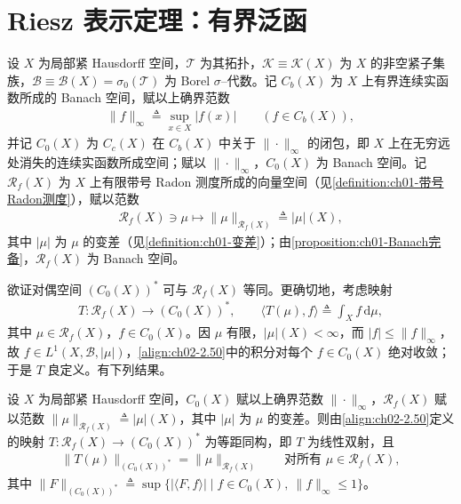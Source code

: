 \documentclass[../../main.tex]{subfiles}%
\begin{document}
\section{Riesz 表示定理：有界泛函}\label{section:ch02-Riesz有界泛函}

设 $X$ 为局部紧 Hausdorff 空间，$\mathscr T$ 为其拓扑，$\mathscr K\equiv\mathscr K(X)$ 为 $X$ 的非空紧子集族，$\mathscr B\equiv\mathscr B(X)=\sigma_0(\mathscr T)$ 为 Borel $\sigma$--代数。记 $C_b(X)$ 为 $X$ 上有界连续实函数所成的 Banach 空间，赋以上确界范数
\begin{align*}
\|f\|_\infty\triangleq\sup_{x\in X}|f(x)|\qquad (f\in C_b(X)),
\end{align*}
并记 $C_0(X)$ 为 $C_c(X)$ 在 $C_b(X)$ 中关于 $\|\cdot\|_\infty$ 的闭包，即 $X$ 上在无穷远处消失的连续实函数所成空间；赋以 $\|\cdot\|_\infty$，$C_0(X)$ 为 Banach 空间。记 $\mathscr R_f(X)$ 为 $X$ 上有限带号 Radon 测度所成的向量空间（见\cref{definition:ch01-带号Radon测度}），赋以范数
\begin{align*}
\mathscr R_f(X)\ni\mu\mapsto\|\mu\|_{\mathscr R_f(X)}\triangleq|\mu|(X),
\end{align*}
其中 $|\mu|$ 为 $\mu$ 的变差（见\cref{definition:ch01-变差}）；由\cref{proposition:ch01-Banach完备}，$\mathscr R_f(X)$ 为 Banach 空间。

欲证对偶空间 $(C_0(X))^*$ 可与 $\mathscr R_f(X)$ 等同。更确切地，考虑映射
\begin{align}
T:\mathscr R_f(X)\to(C_0(X))^*,\qquad\langle T(\mu),f\rangle\triangleq \int_X f\,\mathrm{d}\mu, \label{align:ch02-2.50}
\end{align}
其中 $\mu\in\mathscr R_f(X)$，$f\in C_0(X)$。因 $\mu$ 有限，$|\mu|(X)<\infty$，而 $|f|\leqslant\|f\|_\infty$，故 $f\in L^1(X,\mathscr B,|\mu|)$，\eqref{align:ch02-2.50}中的积分对每个 $f\in C_0(X)$ 绝对收敛；于是 $T$ 良定义。有下列结果。

\begin{theorem}\label{theorem:ch02-Riesz对偶}
设 $X$ 为局部紧 Hausdorff 空间，$C_0(X)$ 赋以上确界范数 $\|\cdot\|_\infty$，$\mathscr R_f(X)$ 赋以范数 $\|\mu\|_{\mathscr R_f(X)}\triangleq|\mu|(X)$，其中 $|\mu|$ 为 $\mu$ 的变差。则由\eqref{align:ch02-2.50}定义的映射 $T:\mathscr R_f(X)\to(C_0(X))^*$ 为等距同构，即 $T$ 为线性双射，且
\begin{align*}
\|T(\mu)\|_{(C_0(X))^*}=\|\mu\|_{\mathscr R_f(X)}\qquad\text{对所有 }\mu\in\mathscr R_f(X),
\end{align*}
其中 $\|F\|_{(C_0(X))^*}\triangleq\sup\{|\langle F,f\rangle|\mid f\in C_0(X),\ \|f\|_\infty\leqslant1\}$。
\end{theorem}
\end{document}
